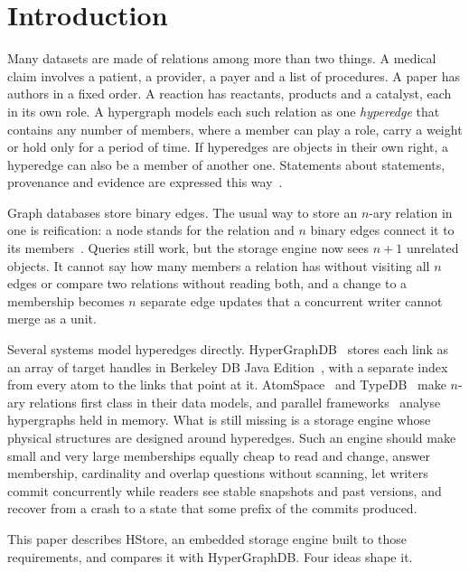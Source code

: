 \section{Introduction}
\label{sec:intro}

Many datasets are made of relations among more than two things. A medical claim involves a patient, a provider, a payer and a list of procedures. A paper has authors in a fixed order. A reaction has reactants, products and a catalyst, each in its own role. A hypergraph models each such relation as one \emph{hyperedge} that contains any number of members, where a member can play a role, carry a weight or hold only for a period of time. If hyperedges are objects in their own right, a hyperedge can also be a member of another one. Statements about statements, provenance and evidence are expressed this way~\cite{wikidata,battiston}.

Graph databases store binary edges. The usual way to store an $n$-ary relation in one is reification: a node stands for the relation and $n$ binary edges connect it to its members~\cite{angles}. Queries still work, but the storage engine now sees $n+1$ unrelated objects. It cannot say how many members a relation has without visiting all $n$ edges or compare two relations without reading both, and a change to a membership becomes $n$ separate edge updates that a concurrent writer cannot merge as a unit.

Several systems model hyperedges directly. HyperGraphDB~\cite{hgdb} stores each link as an array of target handles in Berkeley DB Java Edition~\cite{bdb}, with a separate index from every atom to the links that point at it. AtomSpace~\cite{opencog} and TypeDB~\cite{typeql} make $n$-ary relations first class in their data models, and parallel frameworks~\cite{hygra,mesh,hyperx} analyse hypergraphs held in memory. What is still missing is a storage engine whose physical structures are designed around hyperedges. Such an engine should make small and very large memberships equally cheap to read and change, answer membership, cardinality and overlap questions without scanning, let writers commit concurrently while readers see stable snapshots and past versions, and recover from a crash to a state that some prefix of the commits produced.

This paper describes HStore, an embedded storage engine built to those requirements, and compares it with HyperGraphDB. Four ideas shape it.

